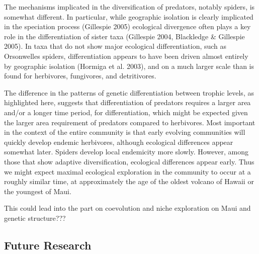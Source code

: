 \documentclass[12pt]{article}
\begin{document}
The mechanisms implicated in the diversification of predators, notably
spiders, is somewhat different. In particular, while geographic
isolation is clearly implicated in the speciation process (Gillespie
2005) ecological divergence often plays a key role in the
differentiation of sister taxa (Gillespie 2004, Blackledge \&
Gillespie 2005). In taxa that do not show major ecological
differentiation, such as Orsonwelles spiders, differentiation appears
to have been driven almost entirely by geographic isolation (Hormiga
et al. 2003), and on a much larger scale than is found for herbivores,
fungivores, and detritivores.

The difference in the patterns of genetic differentiation between
trophic levels, as highlighted here, suggests that differentiation of
predators requires a larger area and/or a longer time period, for
differentiation, which might be expected given the larger area
requirement of predators compared to herbivores. Most important in the
context of the entire community is that early evolving communities
will quickly develop endemic herbivores, although ecological
differences appear somewhat later. Spiders develop local endemicity
more slowly. However, among those that show adaptive diversification,
ecological differences appear early. Thus we might expect maximal
ecological exploration in the community to occur at a roughly similar
time, at approximately the age of the oldest volcano of Hawaii or the
youngest of Maui. 

This could lead into the part on coevolution and niche exploration on
Maui and genetic structure???

\subsection*{Future Research}
\end{document}
